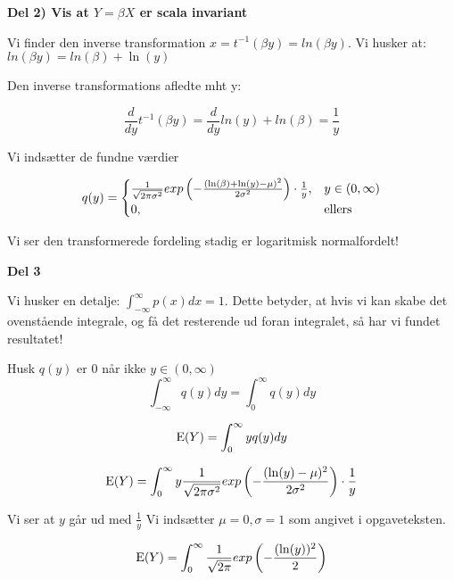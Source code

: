 \textbf{Del 2) Vis at $Y = \beta X$ er scala invariant}

Vi finder den inverse transformation $x = t^{-1} (\beta y) = ln(\beta y)$. Vi husker at: $ln(\beta y) = ln(\beta) + \ln(y) $


Den inverse transformations afledte mht y: 

\begin{equation}
    \frac{d}{dy} t^{-1} (\beta y) = \frac{d}{dy} ln(y) + ln(\beta) = \frac{1}{y}
\end{equation}

Vi indsætter de fundne værdier

\begin{equation}
    q(y) =
    \begin{cases}
         \frac{1}{\sqrt{2 \pi \sigma^2}} exp \left( - \frac{(\ln (\beta) + \ln(y)-\mu)^{2}}{2\sigma^2} \right)  \cdot \frac{1}{y}, &y \in (0, \infty) \\
        0, & \text{ellers}
    \end{cases}
\end{equation}

Vi ser den transformerede fordeling stadig er logaritmisk normalfordelt!

\textbf{Del 3}

Vi husker en detalje: $\int_{-\infty}^{\infty} p(x) dx = 1$. Dette betyder, at hvis vi kan skabe det ovenstående integrale, og få det resterende ud foran integralet, så har vi fundet resultatet!

Husk $q(y)$ er 0 når ikke $y\in(0, \infty)$
\begin{equation}
    \int_{-\infty}^{\infty} q(y) dy = \int_{0}^{\infty} q(y) dy  
\end{equation}


\begin{equation}
    \text{E}(Y) = \int_{0}^{\infty} y q(y) dy  
\end{equation}

\begin{equation}
    \text{E}(Y) = \int_{0}^{\infty} y \frac{1}{\sqrt{2 \pi \sigma^2}} exp \left( - \frac{(\ln (y)-\mu)^{2}}{2\sigma^2} \right)  \cdot \frac{1}{y}
\end{equation}

Vi ser at $y$ går ud med $\frac{1}{y}$ Vi indsætter $\mu = 0, \sigma = 1$ som angivet i opgaveteksten.

\begin{equation}
    \text{E}(Y) = \int_{0}^{\infty}  \frac{1}{\sqrt{2 \pi}} exp \left( - \frac{(\ln (y))^{2}}{2} \right)
\end{equation}

